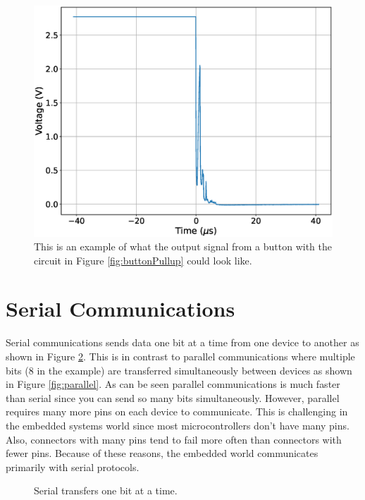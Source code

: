 \begin{figure}[!htb]
	\centering
	\includegraphics[scale=0.5]{buttonSerial/debounce.eps}
	\caption{This is an example of what the output signal from a button with the circuit in Figure \ref{fig:buttonPullup} could look like.}
	\label{fig:buttonDebounce}
\end{figure}


\section{Serial Communications}
Serial communications sends data one bit at a time from one device to another as shown in Figure \ref{fig:serial}. This is in 
contrast to parallel communications where multiple bits (8 in the example) are transferred simultaneously between devices as 
shown in Figure \ref{fig:parallel}. As can be seen parallel communications is much faster than serial since you can send 
so many bits simultaneously. However, parallel requires many more pins on each device to communicate. This is challenging in 
the embedded systems world since most microcontrollers don't have many pins. Also, connectors with many pins tend to fail 
more often than connectors with fewer pins. Because of these reasons, the embedded world communicates primarily with serial 
protocols. 

\begin{figure}[!htb]
	\centering
	\caption{Serial transfers one bit at a time.}
	\label{fig:serial}
\end{figure}
	
